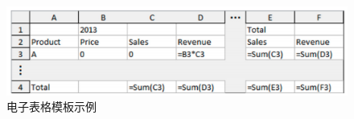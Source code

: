 \begin{figure}[tbp]    
    \centering
    \includegraphics[width=1\textwidth]{figure/template.png}
    \caption{电子表格模板示例}
    \label{figure-template}
\end{figure}